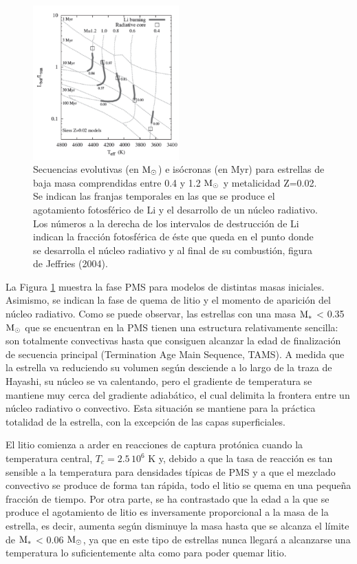 \begin{figure}
	\centering
	\includegraphics[width=0.5\textwidth]{img/tesis/isochrones.pdf}
	\caption {Secuencias evolutivas (en $\mathrm{M}_\odot$) e isócronas (en Myr) para estrellas de baja masa comprendidas entre 0.4 y 1.2 $\mathrm{M}_\odot$ y metalicidad Z=0.02. Se indican las franjas temporales en las que se produce el agotamiento fotosférico de Li y el desarrollo de un núcleo radiativo. Los números a la derecha de los intervalos de destrucción de Li indican la fracción fotosférica de éste que queda en el punto donde se desarrolla el núcleo radiativo y al final de su combustión, figura de Jeffries (2004).}
	\label{fig:isocrhones}
\end{figure}

La Figura \ref{fig:isocrhones} muestra la fase PMS para modelos de distintas masas iniciales. Asimismo, se indican la fase de quema de litio y el momento de aparición del núcleo radiativo. Como se puede observar, las estrellas con una masa $\mathrm{M}_*$ < 0.35 $\mathrm{M}_\odot$ que se encuentran en la PMS tienen una estructura relativamente sencilla: son totalmente convectivas hasta que consiguen alcanzar la edad de finalización de secuencia principal (Termination Age Main Sequence, TAMS). A medida que la estrella va reduciendo su volumen según desciende a lo largo de la traza de Hayashi, su núcleo se va calentando, pero el gradiente de temperatura se mantiene muy cerca del gradiente adiabático, el cual delimita la frontera entre un núcleo radiativo o convectivo. Esta situación se mantiene para la práctica totalidad de la estrella, con la excepción de las capas superficiales.\par 

El litio comienza a arder en reacciones de captura protónica cuando la temperatura central, $T_c=2.5 \, 10^{6}$ K y, debido a que la tasa de reacción es tan sensible a la temperatura para densidades típicas de PMS \citep{Randich2006} y a que el mezclado convectivo se produce de forma tan rápida, todo el litio se quema en una pequeña fracción de tiempo. Por otra parte, se ha contrastado que la edad a la que se produce el agotamiento de litio es inversamente proporcional a la masa de la estrella, es decir, aumenta según disminuye la masa hasta que se alcanza el límite de $\mathrm{M}_*$ < 0.06 $\mathrm{M}_\odot$, ya que en este tipo de estrellas nunca llegará a alcanzarse una temperatura lo suficientemente alta como para poder quemar litio.\par

